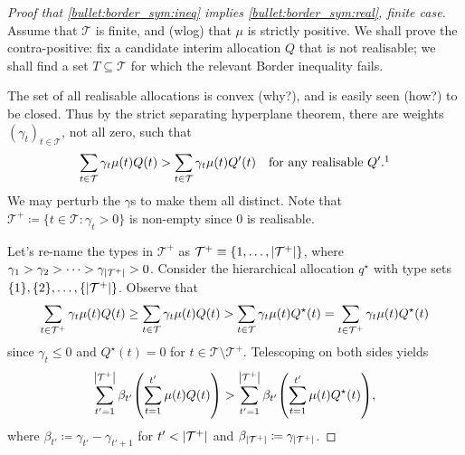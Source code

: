 \begin{proof}[Proof that \ref{bullet:border_sym:ineq} implies \ref{bullet:border_sym:real}, finite case]
	Assume that $\mathcal{T}$ is finite, and (wlog) that $\mu$ is strictly positive.
	We shall prove the contra-positive:
	fix a candidate interim allocation $Q$ that is not realisable;
	we shall find a set $T \subseteq \mathcal{T}$
	for which the relevant Border inequality fails.

	The set of all realisable allocations is convex (why?),
	and is easily seen (how?) to be closed.
	Thus by the strict separating hyperplane theorem,
	there are weights $(\gamma_t)_{t \in \mathcal{T}}$, not all zero, such that
	\begin{equation*}
		\sum_{t \in \mathcal{T}} \gamma_t \mu(t) Q(t)
		> \sum_{t \in \mathcal{T}} \gamma_t \mu(t) Q'(t)
		\quad \text{for any realisable $Q'$.}\footnotemark
	\end{equation*}%
	We may perturb the $\gamma$s to make them all distinct.
	Note that $\mathcal{T}^+ \coloneqq \{ t \in \mathcal{T} : \gamma_t > 0 \}$ is non-empty since $0$ is realisable.


	Let's re-name the types in $\mathcal{T}^+$ as $\mathcal{T}^+ \equiv \{1,\dots,\abs*{\mathcal{T}^+}\}$, where
	$\gamma_1 > \gamma_2 > \cdots > \gamma_{\abs*{\mathcal{T}^+}} > 0$.
	Consider the hierarchical allocation $q^\star$
	with type sets $\{1\},\{2\}, \dots, \{\abs*{\mathcal{T}^+}\}$.
	Observe that
	\begin{equation*}
		\sum_{t \in \mathcal{T}^+} \gamma_t \mu(t) Q(t)
		\geq \sum_{t \in \mathcal{T}} \gamma_t \mu(t) Q(t)
		> \sum_{t \in \mathcal{T}} \gamma_t \mu(t) Q^\star(t)
		\\
		= \sum_{t \in \mathcal{T}^+} \gamma_t \mu(t) Q^\star(t) 
	\end{equation*}
	since $\gamma_t \leq 0$ and $Q^\star(t)=0$ for $t \in \mathcal{T} \setminus \mathcal{T}^+$.
	Telescoping on both sides yields
	\begin{equation*}
		\sum_{t'=1}^{\abs*{\mathcal{T}^+}}
		\beta_{t'}
		\left( \sum_{t=1}^{t'} \mu(t) Q(t) \right)
		> \sum_{t'=1}^{\abs*{\mathcal{T}^+}}
		\beta_{t'}
		\left( \sum_{t=1}^{t'} \mu(t) Q^\star(t) \right) ,
	\end{equation*}
	where $\beta_{t'} \coloneqq \gamma_{t'}-\gamma_{t'+1}$ for $t' < \abs*{\mathcal{T}^+}$ and $\beta_{\abs*{\mathcal{T}^+}} \coloneqq \gamma_{\abs*{\mathcal{T}^+}}$.


\end{proof}
